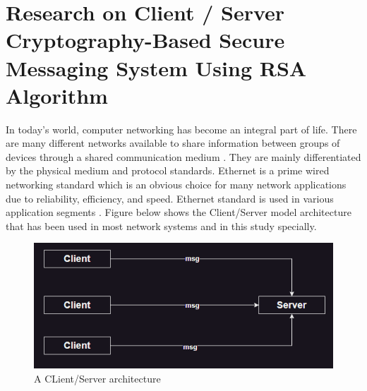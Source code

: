 \section{Research on Client / Server Cryptography-Based Secure Messaging
  System Using RSA Algorithm }
In today’s world, computer networking has become an
integral part of life. There are many different networks
available to share information between groups of devices
through a shared communication medium . They are
mainly differentiated by the physical medium and protocol
standards. Ethernet is a prime wired networking standard
which is an obvious choice for many network applications
due to reliability, efficiency, and speed. Ethernet standard is
used in various application segments . Figure below
shows the Client/Server model architecture that has been
used in most network systems and in this study specially.
\begin{figure}[H]
	\centering
	\includegraphics[width=160mm]{images/clientserver.png}
	\caption{A CLient/Server architecture}
	\label{figclientserver} %
\end{figure}

